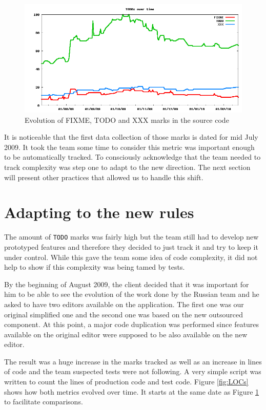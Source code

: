 \documentclass[lnbip]{svmultln}
\begin{document}
\begin{figure}[hbt]
  \centerline{
    \includegraphics[width=120mm]{TODOs}
  }
  \caption{Evolution of FIXME, TODO and XXX marks in the source code}
  \label{fig:TODOs}
\end{figure}

It is noticeable that the first data collection of those marks is
dated for mid July 2009. It took the team some time to consider this
metric was important enough to be automatically tracked. To
consciously acknowledge that the team needed to track complexity was
step one to adapt to the new direction. The next section will present
other practices that allowed us to handle this shift.

\section{Adapting to the new rules}
\label{sec:adapting}

The amount of \texttt{TODO} marks was fairly high but the team still
had to develop new prototyped features and therefore they decided to
just track it and try to keep it under control. While this gave the
team some idea of code complexity, it did not help to show if this
complexity was being tamed by tests.

By the beginning of August 2009, the client decided that it was
important for him to be able to see the evolution of the work done by
the Russian team and he asked to have two editors available on the
application. The first one was our original simplified one and the
second one was based on the new outsourced component. At this point, a
major code duplication was performed since features available on the
original editor were supposed to be also available on the new editor.

The result was a huge increase in the marks tracked as well as an
increase in lines of code and the team suspected tests were not
following. A very simple script was written to count the lines of
production code and test code. Figure \ref{fig:LOCs} shows how both
metrics evolved over time. It starts at the same date as Figure
\ref{fig:TODOs} to facilitate comparisons.
\end{document}
